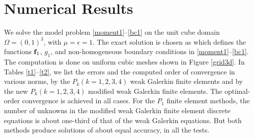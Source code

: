 \documentclass[11pt]{amsart}
\begin{document}
\section{Numerical Results}\label{Section:NE}

We solve the model problem \eqref{moment1}--\eqref{bc1} on the unit cube domain $\Omega=(0,1)^3$,
   with $\mu=\epsilon=1$.
The exact solution is chosen as
which defines the functions $\mathbf{f}_1$, $g_1$, and non-homogeneous boundary conditions in
   \eqref{moment1}--\eqref{bc1}.
The computation is done on uniform cubic meshes shown in Figure \ref{grid3d}.
In Tables \ref{t1}--\ref{t2},  we list the errors and the computed order of convergence
  in various norms, by the  $P_k (k=1,2,3,4)$ weak Galerkin finite elements \cite{Mu-W-Y-Z} and
  by the new $P_k (k=1,2,3,4)$   modified weak Galerkin finite elements.
 The optimal-order convergence is achieved in all cases.  
For the $P_1$ finite element methods,  the number of unknowns in the modified weak Galerkin
  finite element discrete equations is about one-third of that of the weak Galerkin equations.
But both methods produce solutions of about equal accuracy, in all the tests.
\end{document}

